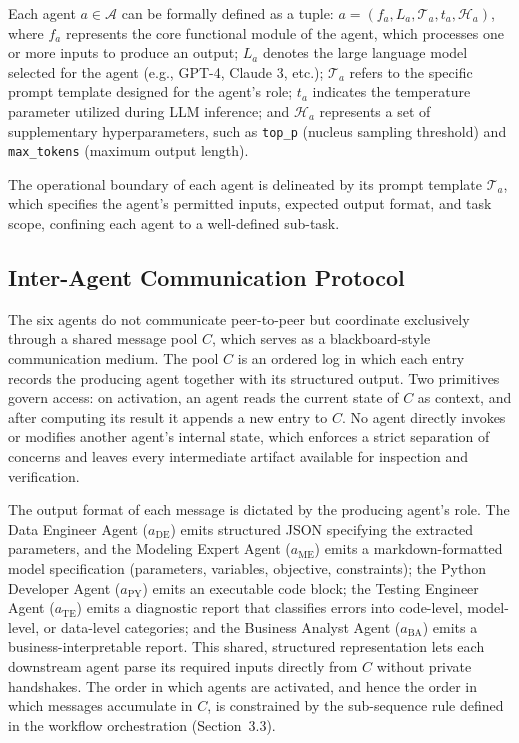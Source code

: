 \documentclass[preprint,12pt]{elsarticle}
\begin{document}
Each agent $a \in \mathcal{A}$ can be formally defined as a tuple: $a=(f_a, L_a, \mathcal{T}_a, t_a, \mathcal{H}_a)$, where $f_a$ represents the core functional module of the agent, which processes one or more inputs to produce an output; $L_a$ denotes the large language model selected for the agent (e.g., GPT-4, Claude 3, etc.); $\mathcal{T}_a$ refers to the specific prompt template designed for the agent's role; $t_a$ indicates the temperature parameter utilized during LLM inference; and $\mathcal{H}_a$ represents a set of supplementary hyperparameters, such as \texttt{top\_p} (nucleus sampling threshold) and \texttt{max\_tokens} (maximum output length).

The operational boundary of each agent is delineated by its prompt template $\mathcal{T}_a$, which specifies the agent's permitted inputs, expected output format, and task scope, confining each agent to a well-defined sub-task.

\subsection{Inter-Agent Communication Protocol}

The six agents do not communicate peer-to-peer but coordinate exclusively through a shared message pool $C$, which serves as a blackboard-style communication medium. The pool $C$ is an ordered log in which each entry records the producing agent together with its structured output. Two primitives govern access: on activation, an agent reads the current state of $C$ as context, and after computing its result it appends a new entry to $C$. No agent directly invokes or modifies another agent's internal state, which enforces a strict separation of concerns and leaves every intermediate artifact available for inspection and verification.

The output format of each message is dictated by the producing agent's role. The Data Engineer Agent ($a_{\text{DE}}$) emits structured JSON specifying the extracted parameters, and the Modeling Expert Agent ($a_{\text{ME}}$) emits a markdown-formatted model specification (parameters, variables, objective, constraints); the Python Developer Agent ($a_{\text{PY}}$) emits an executable code block; the Testing Engineer Agent ($a_{\text{TE}}$) emits a diagnostic report that classifies errors into code-level, model-level, or data-level categories; and the Business Analyst Agent ($a_{\text{BA}}$) emits a business-interpretable report. This shared, structured representation lets each downstream agent parse its required inputs directly from $C$ without private handshakes. The order in which agents are activated, and hence the order in which messages accumulate in $C$, is constrained by the sub-sequence rule defined in the workflow orchestration (Section~3.3).
\end{document}
